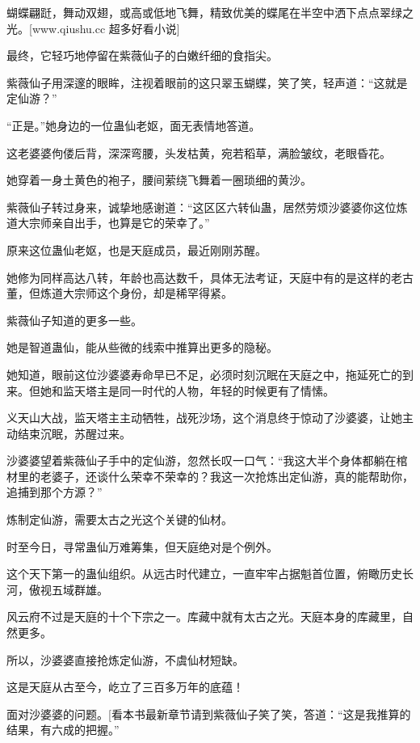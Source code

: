 
\begin{this_body}

蝴蝶翩跹，舞动双翅，或高或低地飞舞，精致优美的蝶尾在半空中洒下点点翠绿之光。[www.qiushu.cc 超多好看小说]

最终，它轻巧地停留在紫薇仙子的白嫩纤细的食指尖。

紫薇仙子用深邃的眼眸，注视着眼前的这只翠玉蝴蝶，笑了笑，轻声道：“这就是定仙游？”

“正是。”她身边的一位蛊仙老妪，面无表情地答道。

这老婆婆佝偻后背，深深弯腰，头发枯黄，宛若稻草，满脸皱纹，老眼昏花。

她穿着一身土黄色的袍子，腰间萦绕飞舞着一圈琐细的黄沙。

紫薇仙子转过身来，诚挚地感谢道：“这区区六转仙蛊，居然劳烦沙婆婆你这位炼道大宗师亲自出手，也算是它的荣幸了。”

原来这位蛊仙老妪，也是天庭成员，最近刚刚苏醒。

她修为同样高达八转，年龄也高达数千，具体无法考证，天庭中有的是这样的老古董，但炼道大宗师这个身份，却是稀罕得紧。

紫薇仙子知道的更多一些。

她是智道蛊仙，能从些微的线索中推算出更多的隐秘。

她知道，眼前这位沙婆婆寿命早已不足，必须时刻沉眠在天庭之中，拖延死亡的到来。但她和监天塔主是同一时代的人物，年轻的时候更有了情愫。

义天山大战，监天塔主主动牺牲，战死沙场，这个消息终于惊动了沙婆婆，让她主动结束沉眠，苏醒过来。

沙婆婆望着紫薇仙子手中的定仙游，忽然长叹一口气：“我这大半个身体都躺在棺材里的老婆子，还谈什么荣幸不荣幸的？我这一次抢炼出定仙游，真的能帮助你，追捕到那个方源？”

炼制定仙游，需要太古之光这个关键的仙材。

时至今日，寻常蛊仙万难筹集，但天庭绝对是个例外。

这个天下第一的蛊仙组织。从远古时代建立，一直牢牢占据魁首位置，俯瞰历史长河，傲视五域群雄。

风云府不过是天庭的十个下宗之一。库藏中就有太古之光。天庭本身的库藏里，自然更多。

所以，沙婆婆直接抢炼定仙游，不虞仙材短缺。

这是天庭从古至今，屹立了三百多万年的底蕴！

面对沙婆婆的问题。[看本书最新章节请到紫薇仙子笑了笑，答道：“这是我推算的结果，有六成的把握。”


\end{this_body}
